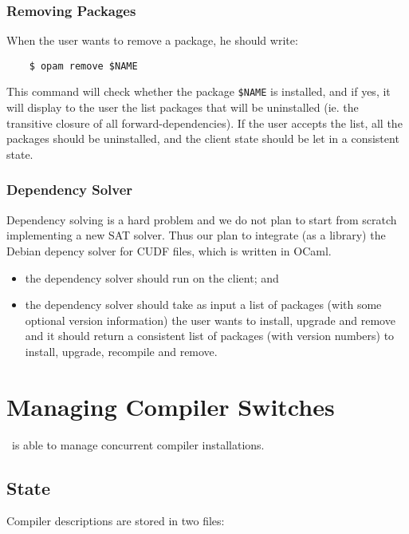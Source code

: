\documentclass[a4paper,10pt]{article}
\begin{document}
\subsubsection{Removing Packages}
\label{opam-remove}

When the user wants to remove a package, he should write:

\begin{verbatim}
    $ opam remove $NAME
\end{verbatim}

This command will check whether the package \verb+$NAME+ is installed,
and if yes, it will display to the user the list packages that will be
uninstalled (ie. the transitive closure of all forward-dependencies).
If the user accepts the list, all the packages should be uninstalled,
and the client state should be let in a consistent state.

\subsubsection{Dependency Solver}
\label{deps}

Dependency solving is a hard problem and we do not plan to start from
scratch implementing a new SAT solver. Thus our plan to integrate (as
a library) the Debian depency solver for CUDF files, which is written
in OCaml.

\begin{itemize}
\item the dependency solver should run on the client; and
\item the dependency solver should take as input a list of packages
  (with some optional version information) the user wants to install,
  upgrade and remove and it should return a consistent list of
  packages (with version numbers) to install, upgrade, recompile and
  remove.
\end{itemize}

\section{Managing Compiler Switches}
\label{section:switches}

\OPAM\ is able to manage concurrent compiler installations.

\subsection{State}

Compiler descriptions are stored in two files:
\end{document}
